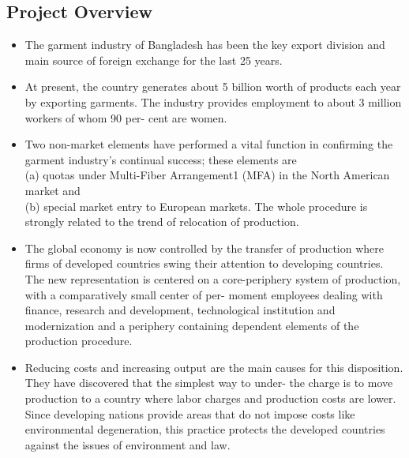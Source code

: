 \documentclass{article}
\begin{document}
\subsection{Project Overview}
\begin{itemize}
\item The garment industry of Bangladesh has been the key export division and 
main source of foreign exchange for the last 25 years.
\item At present, the country generates about 5 billion worth of products each year by exporting garments.
The industry provides employment to about 3 million workers of whom 90 per-
cent are women.
\item Two non-market elements have performed a vital function in
confirming the garment industry’s continual success; these elements are\\
(a) quotas under Multi-Fiber Arrangement1 (MFA) in the North American
market and\\
(b) special market entry to European markets. The whole procedure is strongly
related to the trend of relocation of production.

\item The global economy is now controlled by the transfer of production where firms of developed countries swing their attention to developing countries. The new representation is centered on a core-periphery system of production, with a comparatively small center of per- moment employees dealing with finance, research and development, technological institution and modernization and a periphery containing dependent elements of the production procedure.

\item Reducing costs and increasing output are the main
causes for this disposition. They have discovered that the simplest way to under-
the charge is to move production to a country where labor charges and production
costs are lower. Since developing nations provide areas that do not impose costs
like environmental degeneration, this practice protects the developed countries
against the issues of environment and law.

\end{itemize}
\end{document}
